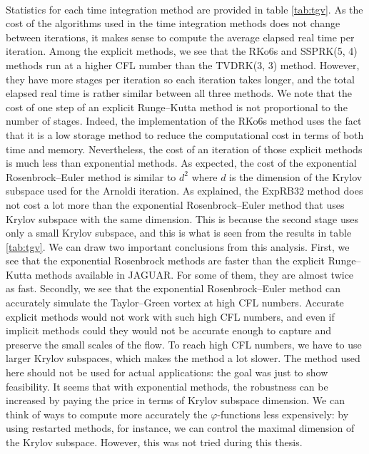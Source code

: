       \paragraph{}
      Statistics for each time integration method are provided in table \ref{tab:tgv}.
      As the cost of the algorithms used in the time integration methods does not change between iterations, it makes sense to compute the average elapsed real time per iteration.
      Among the explicit methods, we see that the RKo6s and SSPRK(5, 4) methods run at a higher CFL number than the TVDRK(3, 3) method.
      However, they have more stages per iteration so each iteration takes longer, and the total elapsed real time is rather similar between all three methods.
      We note that the cost of one step of an explicit Runge--Kutta method is not proportional to the number of stages.
      Indeed, the implementation of the RKo6s method uses the fact that it is a low storage method to reduce the computational cost in terms of both time and memory.
      Nevertheless, the cost of an iteration of those explicit methods is much less than exponential methods.
      As expected, the cost of the exponential Rosenbrock--Euler method is similar to $d^2$ where $d$ is the dimension of the Krylov subspace used for the Arnoldi iteration.
      As explained, the ExpRB32 method does not cost a lot more than the exponential Rosenbrock--Euler method that uses Krylov subspace with the same dimension.
      This is because the second stage uses only a small Krylov subspace, and this is what is seen from the results in table \ref{tab:tgv}.
      We can draw two important conclusions from this analysis.
      First, we see that the exponential Rosenbrock methods are faster than the explicit Runge--Kutta methods available in JAGUAR.
      For some of them, they are almost twice as fast.
      Secondly, we see that the exponential Rosenbrock--Euler method can accurately simulate the Taylor--Green vortex at high CFL numbers.
      Accurate explicit methods would not work with such high CFL numbers, and even if implicit methods could they would not be accurate enough to capture and preserve the small scales of the flow.
      To reach high CFL numbers, we have to use larger Krylov subspaces, which makes the method a lot slower.
      The method used here should not be used for actual applications: the goal was just to show feasibility.
      It seems that with exponential methods, the robustness can be increased by paying the price in terms of Krylov subspace dimension.
      We can think of ways to compute more accurately the $\varphi$-functions less expensively: by using restarted methods, for instance, we can control the maximal dimension of the Krylov subspace.
      However, this was not tried during this thesis.

